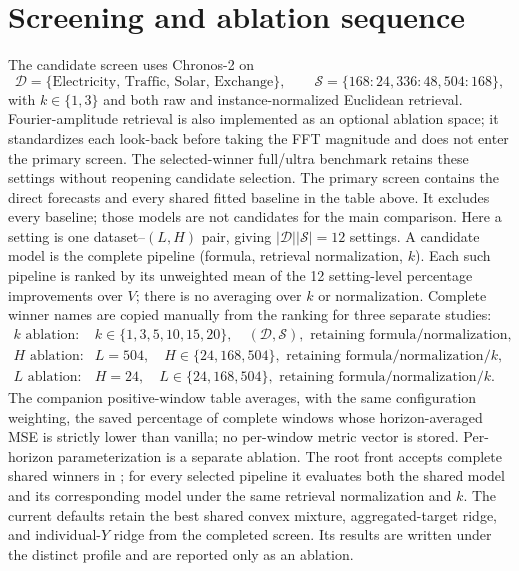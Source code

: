 \documentclass[10pt]{article}
\begin{document}
\section{Screening and ablation sequence}
The candidate screen uses Chronos-2 on
\[
 \mathcal D=\{\text{Electricity, Traffic, Solar, Exchange}\},
 \qquad
 \mathcal S=\{168{:}24,336{:}48,504{:}168\},
\]
with $k\in\{1,3\}$ and both raw and instance-normalized Euclidean retrieval.
Fourier-amplitude retrieval is also implemented as an optional ablation space;
it standardizes each look-back before taking the FFT magnitude and does not
enter the primary screen.
The selected-winner full/ultra benchmark retains these settings without
reopening candidate selection.
The primary screen contains the direct forecasts and every shared fitted
baseline in the table above. It excludes every  baseline;
those models are not candidates for the main comparison.
Here a setting is one dataset--$(L,H)$ pair, giving
$|\mathcal D||\mathcal S|=12$ settings. A candidate model is the complete
pipeline (formula, retrieval normalization, $k$). Each such pipeline is ranked
by its unweighted mean of the 12 setting-level percentage improvements over
$V$; there is no averaging over $k$ or normalization. Complete winner names
are copied manually from the ranking for three separate studies:
\[
\begin{array}{ll}
\text{$k$ ablation:} & k\in\{1,3,5,10,15,20\},\quad (\mathcal D,\mathcal S),
 \text{ retaining formula/normalization},\\
\text{$H$ ablation:} & L=504,\quad H\in\{24,168,504\},
 \text{ retaining formula/normalization/$k$},\\
\text{$L$ ablation:} & H=24,\quad L\in\{24,168,504\},
 \text{ retaining formula/normalization/$k$}.
\end{array}
\]
The companion positive-window table averages, with the same configuration
weighting, the saved percentage of complete windows whose horizon-averaged MSE
is strictly lower than vanilla; no per-window metric vector is stored.
Per-horizon parameterization is a separate ablation. The root front
 accepts complete shared winners in
; for every selected pipeline it evaluates
both the shared model and its corresponding  model under the
same retrieval normalization and $k$. The current defaults retain the best
shared convex mixture, aggregated-target ridge, and individual-$Y$ ridge from
the completed screen. Its results are written under the distinct
 profile and are reported only as an
ablation.
\end{document}
